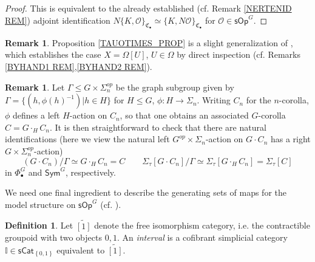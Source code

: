 \documentclass[a4paper,10pt]{article}%
\numberwithin{equation}{section}
\numberwithin{figure}{section}
\theoremstyle{definition} %
\newtheorem{definition}[equation]{Definition}%
\newtheorem{remark}[equation]{Remark}%
\newcommand{\set}[1]{\left\{#1\right\}}%
\renewcommand{\O}{\ensuremath{\mathcal O}}
\newcommand{\1}{\ensuremath{\mathbbm 1}}%
\begin{document}
\begin{proof}
	This is equivalent to the 
	already established (cf. Remark \ref{NERTENID REM}) adjoint identification
	$
	N \{K,\O\}_{\mathfrak{C}_{\bullet}}
	\simeq
	\{K,N \O\}_{\mathfrak{C}_{\bullet}} 
	$
	for $\O \in \mathsf{sOp}^G$.	
\end{proof}



\begin{remark}
	Proposition \ref{TAUOTIMES_PROP} is a slight generalization of 
	\cite[Prop. 7.2]{CM13b},
	which establishes the case
	$X = \Omega[U]$, $U\in \Omega$
	by direct inspection
	(cf. Remarks \ref{BYHAND1 REM},\ref{BYHAND2 REM}).
\end{remark}



\begin{remark}\label{SIGMATAUQUOT REM}
Let $\Gamma \leq G \times \Sigma_n^{op}$
be the graph subgroup given by
$\Gamma = \{(h,\phi(h)^{-1})|h\in H\}$
for $H\leq G$, $\phi\colon H \to \Sigma_n$.
Writing
$C_{n}$ for the $n$-corolla, 
$\phi$ defines a left $H$-action on $C_{n}$,
so that one obtains an associated
$G$-corolla $C = G \cdot_{H} C_{n}$.
It is then straightforward to check that there are natural identifications
(here we view the natural 
left $G^{op}\times \Sigma_n$-action on 
$G \cdot C_{n}$ has a 
right $G\times \Sigma_n^{op}$-action)
\begin{equation}\label{SIGMATAUQUOT EQ}
	(G \cdot C_{n})/\Gamma
\simeq
	G \cdot_H C_{n}
= 
	C
\qquad
	\Sigma_{\tau}[G \cdot C_{n}]/\Gamma
\simeq
	\Sigma_{\tau}[G \cdot_H C_{n}]
= 
	\Sigma_{\tau}[C]
\end{equation}
in $\Phi^G_{\bullet}$ and $\mathsf{Sym}^G$, respectively.
\end{remark}


We need one final ingredient to describe the generating sets of maps for the model structure on
$\mathsf{sOp}^G$
(cf. \cite[Def. 4.4]{BP_HGOP}).


\begin{definition}
	Let $\widetilde{[1]}$ denote the free isomorphism category,
	i.e. the contractible groupoid with two objects $0,1$.
%		
	An \textit{interval} is a cofibrant simplicial category $\mathbb I \in \mathsf{sCat}_{\set{0,1}}$ equivalent to $\widetilde{[1]}$.
\end{definition}

\end{document}
